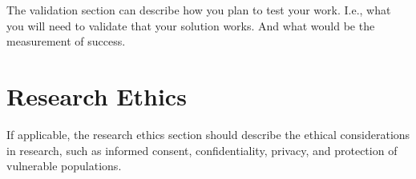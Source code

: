 The validation section can describe how you plan to test your work. I.e., what you will need to validate that your solution works. And what would be the measurement of success. 



\section{Research Ethics}
\label{sec:research_ethics}

If applicable, the research ethics section should describe the ethical considerations in research, such as informed consent, confidentiality, privacy, and protection of vulnerable populations.

